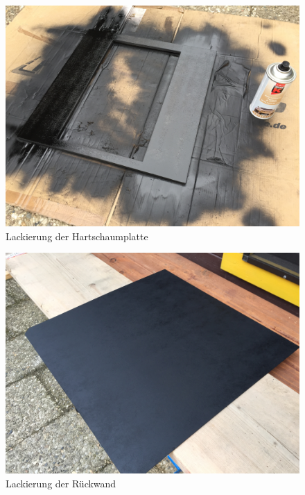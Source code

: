 \begin{figure}[H]
	\includegraphics[scale=0.06]{bilder/Hartschaumplatte.jpg}
	\caption{Lackierung der Hartschaumplatte}
\end{figure}
\begin{figure}[H]
	\includegraphics[scale=0.06]{bilder/Rueckwand.jpg}
	\caption{Lackierung der Rückwand}
\end{figure}
